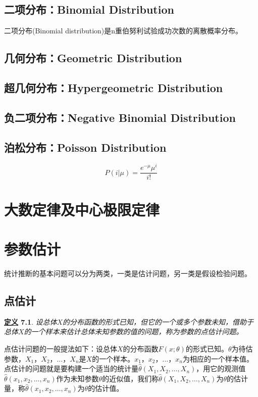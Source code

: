 \documentclass[11pt]{book}
\newcounter{#2}
\newcounter{#2}[#1]
\numberwithin{#2}{#1}
\newtheorem{newdef}{\textbf{\uline{定义}}}[chapter]
\begin{document}
		\section{二项分布：Binomial Distribution}
			二项分布(Binomial distribution)是n重伯努利试验成功次数的离散概率分布。
		\section{几何分布：Geometric Distribution}
		\section{超几何分布：Hypergeometric Distribution}
		\section{负二项分布：Negative Binomial Distribution}
		\section{泊松分布：Poisson Distribution}
			\begin{equation}
				P(i|\mu)= \frac{e^{-\mu}\mu^{i}}{i!}
			\end{equation}
		
		
		
		
		
	
	
	
	\chapter{大数定律及中心极限定律}
	
	
	\chapter{参数估计}
	统计推断的基本问题可以分为两类，一类是估计问题，另一类是假设检验问题。
	\section{点估计}
	\begin{newdef}
		设总体$X$的分布函数的形式已知，但它的一个或多个参数未知，借助于总体$X$的一个样本来估计总体未知参数的值的问题，称为参数的点估计问题。
	\end{newdef}
点估计问题的一般提法如下：设总体$X$的分布函数$F(x;\theta)$的形式已知。$\theta$为待估参数，$X_1$，$X_2$，$\dots$，$X_n$是$X$的一个样本。$x_1$，$x_2$，$\dots$，$x_n$为相应的一个样本值。点估计的问题就是要构建一个适当的统计量$\hat{\theta}(X_1,X_2,\dots,X_n)$，用它的观测值$\hat{\theta}(x_1,x_2,\dots,x_n)$作为未知参数$\theta$的近似值，我们称$\hat{\theta}(X_1,X_2,\dots,X_n)$为$\theta$的估计量，称$\hat{\theta}(x_1,x_2,\dots,x_n)$为$\theta$的估计值。
\end{document}
